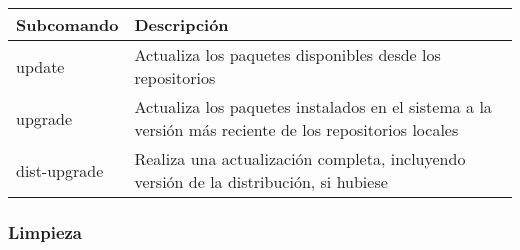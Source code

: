 \begin{longtable}[c]{@{}ll@{}}
\toprule
\begin{minipage}[b]{0.20\columnwidth}\raggedright\strut
Subcomando
\strut\end{minipage} &
\begin{minipage}[b]{0.51\columnwidth}\raggedright\strut
Descripción
\strut\end{minipage}\tabularnewline
\midrule
\endhead
\begin{minipage}[t]{0.20\columnwidth}\raggedright\strut
update
\strut\end{minipage} &
\begin{minipage}[t]{0.51\columnwidth}\raggedright\strut
Actualiza los paquetes disponibles desde los repositorios
\strut\end{minipage}\tabularnewline
\begin{minipage}[t]{0.20\columnwidth}\raggedright\strut
upgrade
\strut\end{minipage} &
\begin{minipage}[t]{0.51\columnwidth}\raggedright\strut
Actualiza los paquetes instalados en el sistema a la versión más
reciente de los repositorios locales
\strut\end{minipage}\tabularnewline
\begin{minipage}[t]{0.20\columnwidth}\raggedright\strut
dist-upgrade
\strut\end{minipage} &
\begin{minipage}[t]{0.51\columnwidth}\raggedright\strut
Realiza una actualización completa, incluyendo versión de la
distribución, si hubiese
\strut\end{minipage}\tabularnewline
\bottomrule
\end{longtable}

\hypertarget{limpieza}{\subsubsection{Limpieza}\label{limpieza}}

